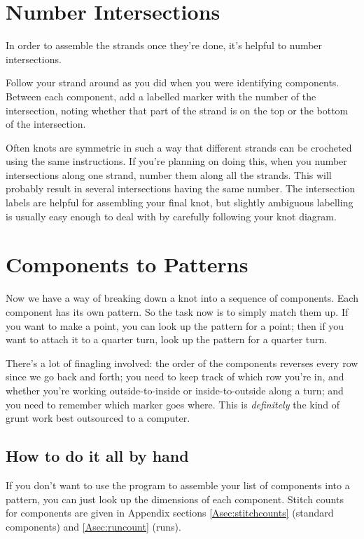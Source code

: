\documentclass[openany]{book}
\begin{document}

\section{Number Intersections}

In order to assemble the strands once they're done, it's helpful to number intersections. 

Follow your strand around as you did when you were identifying components. Between each component, add a labelled marker with the number of the intersection, noting whether that part of the strand is on the top or the bottom of the intersection.

Often knots are symmetric in such a way that different strands can be crocheted using the same instructions. If you're planning on doing this, when you number intersections along one strand, number them along all the strands. This will probably result in several intersections having the same number. The intersection labels are helpful for assembling your final knot, but slightly ambiguous labelling is usually easy enough to deal with by carefully following your knot diagram.


\section{Components to Patterns}
Now we have a way of breaking down a knot into a sequence of components. Each component has its own pattern. So the task now is to simply match them up. If you want to make a point, you can look up the pattern for a point; then if you want to attach it to a quarter turn, look up the pattern for a quarter turn. 

There's a lot of finagling involved:  the order of the components reverses every row since we go back and forth; you need to keep track of which row you're in, and whether you're working outside-to-inside or inside-to-outside along a turn; and you need to remember which marker goes where.  This is \textit{definitely} the kind of grunt work best outsourced to a computer.

\subsection{How to do it all by hand} If you don't want to use the program to assemble your list of components into a pattern, you can just look up the dimensions of each component. Stitch counts for components are given in Appendix sections  \ref{Asec:stitchcounts} (standard components) and \ref{Asec:runcount} (runs). 
\end{document}
